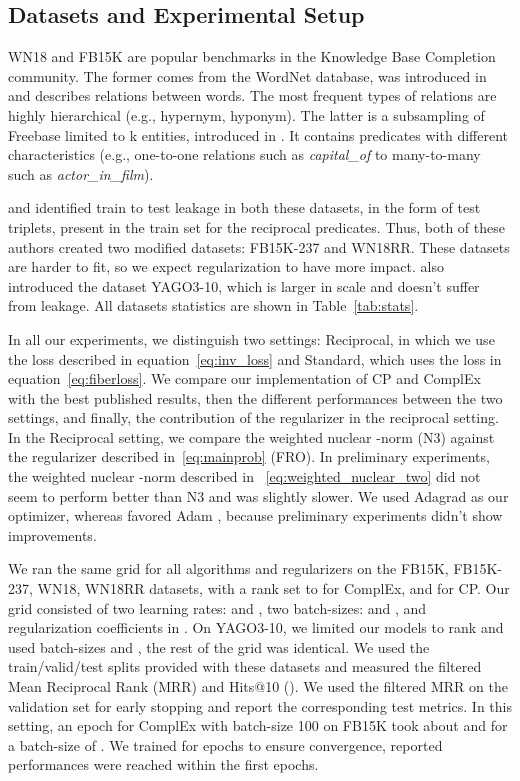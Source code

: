 \documentclass{article}
\newcommand{\CP}{{CP}\xspace}
\newcommand{\complex}{{ComplEx}\xspace}
\newcommand{\fb}{{FB15K}\xspace}
\newcommand{\fbd}{{FB15K-237}\xspace}
\newcommand{\wn}{{WN18}\xspace}
\newcommand{\wnrr}{{WN18RR}\xspace}
\newcommand{\yago}{{YAGO3-10}\xspace}
\begin{document}
\subsection{Datasets and Experimental Setup}
\wn and \fb are popular benchmarks in the Knowledge Base Completion community. The former comes from the WordNet database, was introduced in \citet{bordes_semantic_2014} and describes relations between words. The most frequent types of relations are highly hierarchical (e.g., hypernym, hyponym). The latter is a subsampling of Freebase limited to k entities, introduced in \citet{bordes_translating_2013}. It contains predicates with different characteristics (e.g., one-to-one relations such as \emph{capital\_of} to many-to-many such as \emph{actor\_in\_film}).

\citet{toutanova_observed_2015} and \citet{dettmers2017convolutional} identified train to test leakage in both these datasets, in the form of test triplets, present in the train set for the reciprocal predicates. Thus, both of these authors created two modified datasets: \fbd and \wnrr. These datasets are harder to fit, so we expect regularization to have more impact. \citet{dettmers2017convolutional} also introduced the dataset \yago, which is larger in scale and doesn't suffer from leakage. All datasets statistics are shown in Table~\ref{tab:stats}.

In all our experiments, we distinguish two settings: Reciprocal, in which we use the loss described in equation~\eqref{eq:inv_loss} and Standard, which uses the loss in equation~\eqref{eq:fiberloss}. We compare our implementation of \CP and \complex with the best published results, then the different performances between the two settings, and finally, the contribution of the regularizer in the reciprocal setting. In the Reciprocal setting, we compare the weighted nuclear -norm (N3) against the regularizer described in~\eqref{eq:mainprob} (FRO). In preliminary experiments, the weighted nuclear -norm described in ~\eqref{eq:weighted_nuclear_two} did not seem to perform better than N3 and was slightly slower. We used Adagrad \citep{duchi_adaptive_2011} as our optimizer, whereas \citet{kadlec_knowledge_2017} favored Adam \citep{kingma2014adam}, because preliminary experiments didn't show improvements.

We ran the same grid for all algorithms and regularizers on the \fb, \fbd, \wn, \wnrr datasets, with a rank set to  for \complex, and  for \CP. Our grid consisted of two learning rates:  and , two batch-sizes:  and , and regularization coefficients in . On \yago, we limited our models to rank  and used batch-sizes  and , the rest of the grid was identical. We used the train/valid/test splits provided with these datasets and measured the filtered  Mean Reciprocal Rank (MRR) and Hits@10 (\citet{bordes_translating_2013}). We used the filtered MRR on the validation set for early stopping and report the corresponding test metrics. In this setting, an epoch for \complex with batch-size 100 on \fb took about  and  for a batch-size of . We trained for  epochs to ensure convergence, reported performances were reached within the first  epochs.
\end{document}

